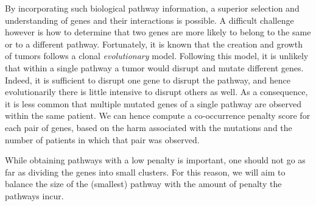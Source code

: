 \documentclass[conference]{IEEEtran}
\begin{document}
By incorporating such biological pathway information, a superior selection and understanding of genes and their interactions is possible. %
%
A difficult challenge however is how to determine that two genes are more likely to belong to the same or to a different pathway. Fortunately, it is known that the creation and growth of tumors follows a clonal \textit{evolutionary} model. Following this model, it is unlikely that within a single pathway a tumor would disrupt and mutate different genes. Indeed, it is sufficient to disrupt one gene to disrupt the pathway, and hence evolutionarily there is little intensive to disrupt others as well. As a consequence, it is less common that multiple mutated genes of a single pathway are observed within the same patient. We can hence compute a co-occurrence penalty score for each pair of genes, based on the harm associated with the mutations and the number of patients in which that pair was observed.

While obtaining pathways with a low penalty is important, one should not go as far as dividing the genes into small clusters. For this reason, we will aim to balance the size of the (smallest) pathway with the amount of penalty the pathways incur.
\end{document}
